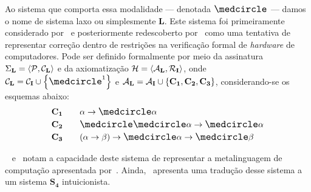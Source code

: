     Ao sistema que comporta essa modalidade --- denotada $\lax$ --- damos o nome de sistema laxo ou simplesmente $\mathbf{L}$. Este sistema foi primeiramente considerado por~\cite{Curry-A,Curry-B} e posteriormente redescoberto por~\cite{Fairtlough,Mendler} como uma tentativa de representar correção dentro de restrições na verificação formal de \emph{hardware} de computadores. Pode ser definido formalmente por meio da assinatura $\Sigma_\mathbf{L}=\langle\mathcal{P},\mathcal{C}_\mathbf{L}\rangle$ e da axiomatização $\mathcal{H}=\langle\mathcal{A}_\mathbf{L},\mathcal{R}_\mathbf{I}\rangle$, onde $\mathcal{C}_\mathbf{L}=\mathcal{C}_\mathbf{I}\cup\set{\lax^1}$ e $\mathcal{A}_\mathbf{L}=\mathcal{A}_\mathbf{I}\cup\left\{\mathbf{C_1},\mathbf{C_2},\mathbf{C_3}\right\}$, considerando-se os esquemas abaixo:
    \begin{alignat*}{3}
        &\mathbf{C_1}\quad&&\alpha\to\lax\alpha\\
        &\mathbf{C_2}\quad&&\lax\lax\alpha\to\lax\alpha\\
        &\mathbf{C_3}\quad&&(\alpha\to\beta)\to\lax\alpha\to\lax\beta
    \end{alignat*}

~\cite{Benton} e~\cite{Pfenning} notam a capacidade deste sistema de representar a metalinguagem de computação apresentada por~\cite{Moggi}.
    Ainda,~\cite{Pfenning} apresenta uma tradução desse sistema a um sistema $\mathbf{S_4}$ intuicionista.